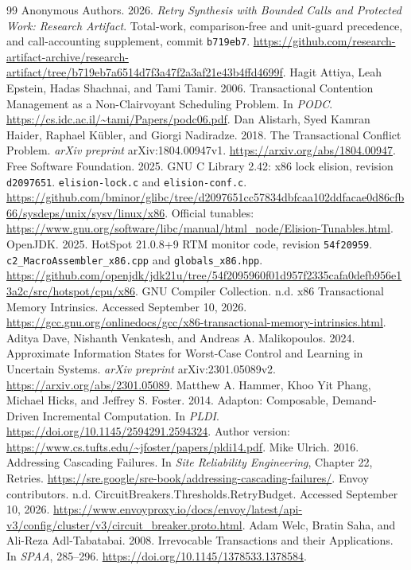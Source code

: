 \documentclass[acmsmall,screen,review,anonymous]{acmart}
\begin{document}
\begin{thebibliography}{99}
 Anonymous Authors. 2026. \emph{Retry Synthesis with Bounded Calls and Protected Work: Research Artifact}. Total-work, comparison-free and unit-guard precedence, and call-accounting supplement, commit \texttt{b719eb7}. \url{https://github.com/research-artifact-archive/research-artifact/tree/b719eb7a6514d7f3a47f2a3af21e43b4ffd4699f}.
 Hagit Attiya, Leah Epstein, Hadas Shachnai, and Tami Tamir. 2006. Transactional Contention Management as a Non-Clairvoyant Scheduling Problem. In \emph{PODC}. \url{https://cs.idc.ac.il/~tami/Papers/podc06.pdf}.
 Dan Alistarh, Syed Kamran Haider, Raphael K\"ubler, and Giorgi Nadiradze. 2018. The Transactional Conflict Problem. \emph{arXiv preprint} arXiv:1804.00947v1. \url{https://arxiv.org/abs/1804.00947}.
 Free Software Foundation. 2025. GNU C Library 2.42: x86 lock elision, revision \texttt{d2097651}. \texttt{elision-lock.c} and \texttt{elision-conf.c}. \url{https://github.com/bminor/glibc/tree/d2097651cc57834dbfcaa102ddfacae0d86cfb66/sysdeps/unix/sysv/linux/x86}. Official tunables: \url{https://www.gnu.org/software/libc/manual/html_node/Elision-Tunables.html}.
 OpenJDK. 2025. HotSpot 21.0.8+9 RTM monitor code, revision \texttt{54f20959}. \texttt{c2\_MacroAssembler\_x86.cpp} and \texttt{globals\_x86.hpp}. \url{https://github.com/openjdk/jdk21u/tree/54f2095960f01d957f2335cafa0defb956e13a2c/src/hotspot/cpu/x86}.
 GNU Compiler Collection. n.d. x86 Transactional Memory Intrinsics. Accessed September 10, 2026. \url{https://gcc.gnu.org/onlinedocs/gcc/x86-transactional-memory-intrinsics.html}.
 Aditya Dave, Nishanth Venkatesh, and Andreas A. Malikopoulos. 2024. Approximate Information States for Worst-Case Control and Learning in Uncertain Systems. \emph{arXiv preprint} arXiv:2301.05089v2. \url{https://arxiv.org/abs/2301.05089}.
 Matthew A. Hammer, Khoo Yit Phang, Michael Hicks, and Jeffrey S. Foster. 2014. Adapton: Composable, Demand-Driven Incremental Computation. In \emph{PLDI}. \url{https://doi.org/10.1145/2594291.2594324}. Author version: \url{https://www.cs.tufts.edu/~jfoster/papers/pldi14.pdf}.
 Mike Ulrich. 2016. Addressing Cascading Failures. In \emph{Site Reliability Engineering}, Chapter 22, Retries. \url{https://sre.google/sre-book/addressing-cascading-failures/}.
 Envoy contributors. n.d. CircuitBreakers.Thresholds.RetryBudget. Accessed September 10, 2026. \url{https://www.envoyproxy.io/docs/envoy/latest/api-v3/config/cluster/v3/circuit_breaker.proto.html}.
 Adam Welc, Bratin Saha, and Ali-Reza Adl-Tabatabai. 2008. Irrevocable Transactions and their Applications. In \emph{SPAA}, 285--296. \url{https://doi.org/10.1145/1378533.1378584}.


\end{thebibliography}
\end{document}
